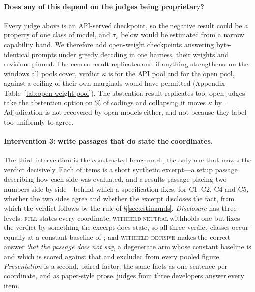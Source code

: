 \documentclass[11pt]{article}
\begin{document}


\paragraph{Does any of this depend on the judges being proprietary?}
Every judge above is an API-served checkpoint, so the negative result could be a
property of one class of model, and $\sigma_r$ below would be estimated from a
narrow capability band. We therefore add \OwjNOpen{} open-weight checkpoints
answering byte-identical prompts under greedy decoding in one harness, their
weights and revisions pinned. The census result replicates and if anything
strengthens: on the \OwjCensusN{} windows all pools cover, verdict $\kappa$ is
\OwjKApi{} for the API pool and \OwjKOpen{} for the open pool, against a ceiling
of \OwjKmaxOpen{} their own marginals would have permitted (Appendix Table~\ref{tab:open-weight-pool}). The abstention
result replicates too: open judges take the abstention option on
\OwjAbsShare\% of codings and collapsing it moves $\kappa$ by \OwjAbsDiff{}.
Adjudication is not recovered by open models either, and not because they label
too uniformly to agree.


\paragraph{Intervention 3: write passages that do state the coordinates.}
The third intervention is the constructed benchmark, the only one that moves the
verdict decisively. Each of \InsTwoItems{} items is a short synthetic excerpt---a
setup passage describing how each side was evaluated, and a results passage
placing two numbers side by side---behind which a specification fixes, for C1,
C2, C4 and C5, whether the two sides agree and whether the excerpt discloses the
fact, from which the verdict follows by the rule of \S\ref{sec:estimands}.
\emph{Disclosure} has three levels: \textsc{full} states every coordinate;
\textsc{withheld-neutral} withholds one but fixes the verdict by something the
excerpt does state, so all three verdict classes occur equally at a constant
baseline of \InsBalBase{}; and \textsc{withheld-decisive} makes the correct
answer \emph{that the passage does not say}, a degenerate arm whose constant
baseline is \InsForceBase{} and which is scored against that and excluded from
every pooled figure. \emph{Presentation} is a second, paired factor: the same
facts as one sentence per coordinate, and as paper-style prose.
\InsTwoJudges{} judges from three developers answer every item.
\end{document}
